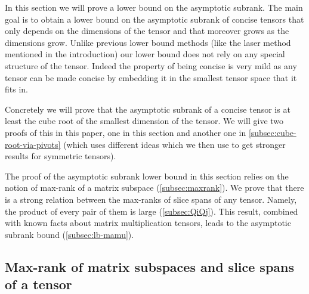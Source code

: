 \documentclass{daj}
\begin{document}
In this section we will prove a lower bound on the asymptotic subrank.
The main goal is to obtain a lower bound on the asymptotic subrank of concise tensors that only depends on the dimensions of the tensor and that moreover grows as the dimensions grow. Unlike previous lower bound methods (like the laser method mentioned in the introduction) our lower bound does not rely on any special structure of the tensor. Indeed the property of being concise is very mild as any tensor can be made concise by embedding it in the smallest tensor space that it fits in.  %

Concretely we will prove that the asymptotic subrank of a concise tensor is at least the cube root of the smallest dimension of the tensor. We will give two proofs of this in this paper, one in this section and another one in \autoref{subsec:cube-root-via-pivots} (which uses different ideas which we then use to get stronger results for symmetric tensors).

The proof of the asymptotic subrank lower bound in this section relies on the notion of max-rank of a matrix subspace (\autoref{subsec:maxrank}). %
We prove that there is a strong relation between the max-ranks of slice spans of any tensor. Namely, the product of every pair of them is large (\autoref{subsec:QiQj}). This result, combined with known facts about matrix multiplication tensors, leads to the asymptotic subrank bound (\autoref{subsec:lb-mamu}).

%
%

%

%

\subsection{Max-rank of matrix subspaces and slice spans of a tensor}\label{subsec:maxrank}
\end{document}
